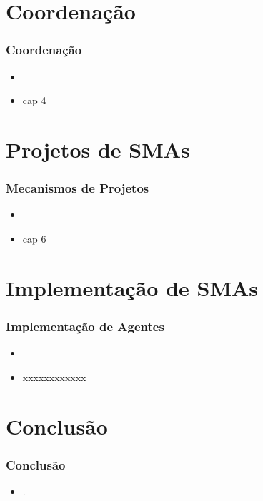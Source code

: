 \documentclass[10pt]{beamer}
\begin{document}
\section{Coordenação}
\begin{frame}

    \frametitle{Coordenação}
    \begin{itemize}
    \pause
      \item 
\pause
      \item cap 4
    
    \end{itemize}
\end{frame}


\section{Projetos de SMAs}
\begin{frame}

    \frametitle{Mecanismos de Projetos}
    \begin{itemize}
    \pause
      \item 
\pause
      \item cap 6
    
    \end{itemize}
\end{frame}


\section{Implementação de SMAs}
\begin{frame}

    \frametitle{Implementação de Agentes}
    \begin{itemize}
    \pause
      \item 
\pause
      \item xxxxxxxxxxxx
    
    \end{itemize}
\end{frame}




\section{Conclusão}
\begin{frame}
    \frametitle{Conclusão}
    \begin{itemize}
    \item .
    \end{itemize}
\end{frame}
\end{document}
